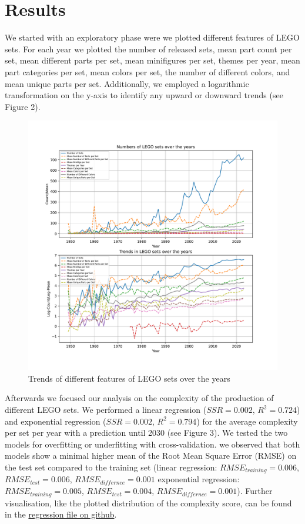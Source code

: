 \documentclass{article}
\theoremstyle{plain}
\theoremstyle{definition}
\theoremstyle{remark}
\begin{document}
\section{Results}\label{sec:results}
We started with an exploratory phase were we plotted different features of LEGO sets. For each year we plotted the number of released sets, mean part count per set, mean different parts per set, mean minifigures per set, themes per year, mean part categories per set, mean colors per set, the number of different colors, and mean unique parts per set. Additionally, we employed a logarithmic transformation on the y-axis to identify any  upward or downward trends (see Figure 2).

\begin{figure}[ht]
 \vskip 0.2in
 \begin{center}
 \centerline{\includegraphics[width=\columnwidth]{Images/Exploration.pdf}}
\caption{Trends of different features of LEGO sets over the years}
\label{icml-historical}
 \end{center}
 \vskip -0.2in
\end{figure}

Afterwards we focused our analysis on the complexity of the production of different LEGO sets. We performed a linear regression ($SSR = 0.002$, $R^2= 0.724$) and exponential regression ($SSR = 0.002$, $R^2= 0.794$) for the average complexity per set per year with a prediction until 2030 (see Figure 3). We tested the two models for overfitting or underfitting with cross-validation. we observed that both models show a minimal higher mean of the Root Mean Square Error (RMSE) on the test set compared to the training set (linear regression: $RMSE_{training} = 0.006$, $RMSE_{test} = 0.006$, $RMSE_{differnce} = 0.001$ exponential regression: $RMSE_{training} = 0.005$, $RMSE_{test} = 0.004$, $RMSE_{differnce} = 0.001$). Further visualisation, like the plotted distribution of the complexity score, can be found in the \href{https://github.com/eddiebeach99/Data_Literacy/blob/main/Analysis/complexity_regression.ipynb}{regression file on github}.
\end{document}
